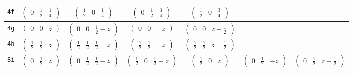 \documentclass[fleqn,9pt,landscape]{jsarticle}
\begin{document}
\begin{center}
\begin{longtable}{ccccccc}
{\tt 4f} & $ \begin{pmatrix} 0 & \frac{1}{2} & \frac{1}{4} \end{pmatrix} $ & $ \begin{pmatrix} \frac{1}{2} & 0 & \frac{1}{4} \end{pmatrix} $ & $ \begin{pmatrix} 0 & \frac{1}{2} & \frac{3}{4} \end{pmatrix} $ & $ \begin{pmatrix} \frac{1}{2} & 0 & \frac{3}{4} \end{pmatrix} $ & $  $ & $  $ \\ \hline
{\tt 4g} & $ \begin{pmatrix} 0 & 0 & z \end{pmatrix} $ & $ \begin{pmatrix} 0 & 0 & \frac{1}{2} - z \end{pmatrix} $ & $ \begin{pmatrix} 0 & 0 & - z \end{pmatrix} $ & $ \begin{pmatrix} 0 & 0 & z + \frac{1}{2} \end{pmatrix} $ & $  $ & $  $ \\ \hline
{\tt 4h} & $ \begin{pmatrix} \frac{1}{2} & \frac{1}{2} & z \end{pmatrix} $ & $ \begin{pmatrix} \frac{1}{2} & \frac{1}{2} & \frac{1}{2} - z \end{pmatrix} $ & $ \begin{pmatrix} \frac{1}{2} & \frac{1}{2} & - z \end{pmatrix} $ & $ \begin{pmatrix} \frac{1}{2} & \frac{1}{2} & z + \frac{1}{2} \end{pmatrix} $ & $  $ & $  $ \\ \hline
{\tt 8i} & $ \begin{pmatrix} 0 & \frac{1}{2} & z \end{pmatrix} $ & $ \begin{pmatrix} 0 & \frac{1}{2} & \frac{1}{2} - z \end{pmatrix} $ & $ \begin{pmatrix} \frac{1}{2} & 0 & \frac{1}{2} - z \end{pmatrix} $ & $ \begin{pmatrix} \frac{1}{2} & 0 & z \end{pmatrix} $ & $ \begin{pmatrix} 0 & \frac{1}{2} & - z \end{pmatrix} $ & $ \begin{pmatrix} 0 & \frac{1}{2} & z + \frac{1}{2} \end{pmatrix} $ \\

\end{longtable}
\end{center}
\end{document}
